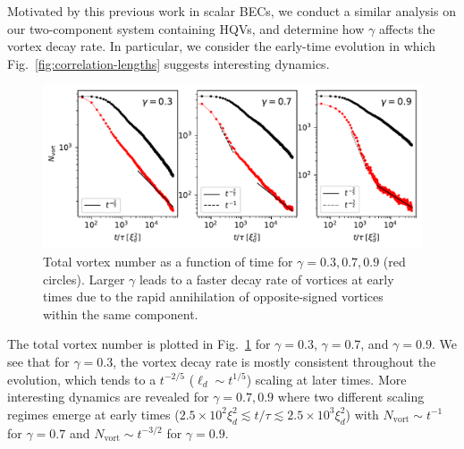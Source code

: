 Motivated by this previous work in scalar BECs, we conduct a similar analysis
on our two-component system containing HQVs, and determine how \(\gamma \)
affects the vortex decay rate.
In particular, we consider the early-time evolution in which
Fig.~\ref{fig:correlation-lengths} suggests interesting dynamics.
\begin{figure}
    \centering
    \includegraphics[width=\textwidth]{gfx/ch-twoCompDynamics/vortex_number.pdf}
    \caption[Total vortex number as a function of time]
    {Total vortex number as a function of time for
        \(\gamma=0.3,0.7,0.9\) (red circles).
        Larger \(\gamma \) leads to a faster decay rate of vortices at
        early times due to the rapid annihilation of opposite-signed vortices
        within the same component.\label{fig:vortex-number}}
\end{figure}
The total vortex number is plotted in Fig.~\ref{fig:vortex-number} for
\(\gamma=0.3\), \(\gamma=0.7\), and \(\gamma=0.9\).
We see that for \(\gamma=0.3\), the vortex decay rate is mostly consistent
throughout the evolution, which tends to a \(t^{-2/5}\)
(\(\ell_d \sim t^{1/5}\)) scaling at later times.
More interesting dynamics are revealed for \(\gamma=0.7, 0.9\) where two
different scaling regimes emerge at early times
(\(2.5\times10^2\xi_d^2 \lesssim t/\tau \lesssim 2.5\times10^3\xi_d^2\)) with
\(N_\mathrm{vort} \sim t^{-1}\) for \(\gamma=0.7\) and
\(N_\mathrm{vort} \sim t^{-3/2}\) for \(\gamma=0.9\).

